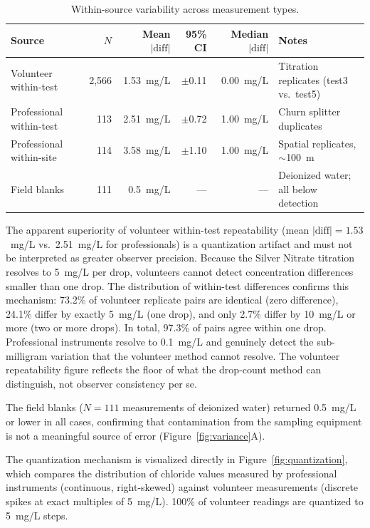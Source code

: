 \documentclass[lineno]{wlpeerj}
\begin{document}
\begin{table}[ht]
\centering
\caption{Within-source variability across measurement types.}
\label{tab:variance}
\begin{tabular}{p{3cm} r r r r p{3.5cm}}
\toprule
Source & $N$ & Mean $|\mathrm{diff}|$ & 95\% CI & Median $|\mathrm{diff}|$ & Notes \\
\midrule
Volunteer within-test & 2,566 & 1.53~mg/L & $\pm$0.11 & 0.00~mg/L & Titration replicates (test3 vs.\ test5) \\
Professional within-test & 113 & 2.51~mg/L & $\pm$0.72 & 1.00~mg/L & Churn splitter duplicates \\
Professional within-site & 114 & 3.58~mg/L & $\pm$1.10 & 1.00~mg/L & Spatial replicates, $\sim$100~m \\
Field blanks & 111 & 0.5~mg/L & --- & --- & Deionized water; all below detection \\
\bottomrule
\end{tabular}
\end{table}

The apparent superiority of volunteer within-test repeatability (mean $|\mathrm{diff}| = 1.53$~mg/L vs.\ 2.51~mg/L for professionals) is a quantization artifact and must not be interpreted as greater observer precision. Because the Silver Nitrate titration resolves to 5~mg/L per drop, volunteers cannot detect concentration differences smaller than one drop. The distribution of within-test differences confirms this mechanism: 73.2\% of volunteer replicate pairs are identical (zero difference), 24.1\% differ by exactly 5~mg/L (one drop), and only 2.7\% differ by 10~mg/L or more (two or more drops). In total, 97.3\% of pairs agree within one drop. Professional instruments resolve to 0.1~mg/L and genuinely detect the sub-milligram variation that the volunteer method cannot resolve. The volunteer repeatability figure reflects the floor of what the drop-count method can distinguish, not observer consistency per se.

The field blanks ($N=111$ measurements of deionized water) returned 0.5~mg/L or lower in all cases, confirming that contamination from the sampling equipment is not a meaningful source of error (Figure~\ref{fig:variance}A).

The quantization mechanism is visualized directly in Figure~\ref{fig:quantization}, which compares the distribution of chloride values measured by professional instruments (continuous, right-skewed) against volunteer measurements (discrete spikes at exact multiples of 5~mg/L). 100\% of volunteer readings are quantized to 5~mg/L steps.
\end{document}
